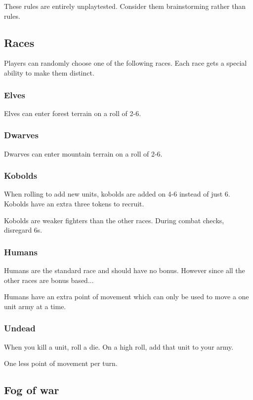 \documentclass{article}
\begin{document}
These rules are entirely unplaytested.  Consider them brainstorming rather than rules.

\subsection{Races}

Players can randomly choose one of the following races.  Each race gets a special ability to make them distinct.

\subsubsection{Elves}

Elves can enter forest terrain on a roll of 2-6.

\subsubsection{Dwarves}

Dwarves can enter mountain terrain on a roll of 2-6.

\subsubsection{Kobolds}

When rolling to add new units, kobolds are added on 4-6 instead of just 6.  Kobolds have an extra three tokens to recruit.

Kobolds are weaker fighters than the other races.  During combat checks, disregard 6s.

\subsubsection{Humans}

Humans are the standard race and should have no bonus.  However since all the other races are bonus based...

Humans have an extra point of movement which can only be used to move a one unit army at a time.  

\subsubsection{Undead}

When you kill a unit, roll a die.  On a high roll, add that unit to your army.  

One less point of movement per turn.

\subsection{Fog of war}
\end{document}
